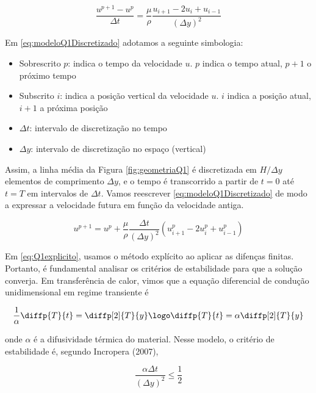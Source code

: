\begin{equation}\label{eq:modeloQ1Discretizado}
    \frac{u^{p+1} - u^p}{\Delta t} = \frac{\mu}{\rho} \frac{u_{i+1} - 2u_i + u_{i-1}}{\left(\Delta y\right)^2}
\end{equation}

Em \eqref{eq:modeloQ1Discretizado} adotamos a seguinte simbologia:

\begin{itemize}
    \item Sobrescrito $p$: indica o tempo da velocidade $u$. $p$ indica o tempo atual, $p + 1$ o próximo tempo
    \item Subscrito $i$: indica a posição vertical da velocidade $u$. $i$ indica a posição atual, $i + 1$ a próxima posição
    \item $\Delta t$: intervalo de discretização no tempo
    \item $\Delta y$: intervalo de discretização no espaço (vertical)
\end{itemize}

Assim, a linha média da Figura \ref*{fig:geometriaQ1} é discretizada em $H / \Delta y$ elementos de
comprimento $ \Delta y$, e o tempo é transcorrido a partir de $t = 0$ até $t = T$ em intervalos de
$ \Delta t$. Vamos reescrever \eqref{eq:modeloQ1Discretizado} de modo a expressar a
velocidade futura em função da velocidade antiga.

\begin{equation}\label{eq:Q1explicito}
    u^{p+1} = u^p + \frac{\mu}{\rho} \frac{\Delta t}{\left(\Delta y\right)^2} \left(u_{i+1}^p - 2u_i^p + u_{i-1}^p\right)
\end{equation}

Em \eqref{eq:Q1explicito}, usamos o método explícito ao aplicar as difenças finitas. Portanto,
é fundamental analisar os critérios de estabilidade para que a solução converja. Em transferência
de calor, vimos que a equação diferencial de condução unidimensional em regime transiente é

\begin{equation}\label{eq:transCalTransiente}
    \frac{1}{\alpha} \diffp{T}{t} = \diffp[2]{T}{y} \logo \diffp{T}{t} = \alpha \diffp[2]{T}{y}
\end{equation}

\noindent onde $\alpha$ é a difusividade térmica do material. Nesse modelo, o critério de estabilidade
é, segundo Incropera (2007),

\begin{equation}\label{eq:transCalestabilidade}
    \frac{\alpha \Delta t}{\left(\Delta y\right)^2} \leq \frac{1}{2}
\end{equation}

